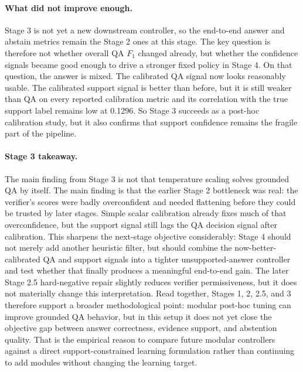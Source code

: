 \paragraph{What did not improve enough.}
Stage 3 is not yet a new downstream controller, so the end-to-end answer and
abstain metrics remain the Stage 2 ones at this stage.
The key question is therefore not whether overall QA \(F_1\) changed already,
but whether the confidence signals became good enough to drive a stronger fixed
policy in Stage 4.
On that question, the answer is mixed.
The calibrated QA signal now looks reasonably usable.
The calibrated support signal is better than before, but it is still weaker
than QA on every reported calibration metric and its correlation with the true
support label remains low at 0.1296.
So Stage 3 succeeds as a post-hoc calibration study, but it also confirms that
support confidence remains the fragile part of the pipeline.

\paragraph{Stage 3 takeaway.}
The main finding from Stage 3 is not that temperature scaling solves grounded
QA by itself.
The main finding is that the earlier Stage 2 bottleneck was real:
the verifier's scores were badly overconfident and needed flattening before
they could be trusted by later stages.
Simple scalar calibration already fixes much of that overconfidence, but the
support signal still lags the QA decision signal after calibration.
This sharpens the next-stage objective considerably:
Stage 4 should not merely add another heuristic filter, but should combine the
now-better-calibrated QA and support signals into a tighter unsupported-answer
controller and test whether that finally produces a meaningful end-to-end gain.
The later Stage 2.5 hard-negative repair slightly reduces verifier
permissiveness, but it does not materially change this interpretation.
Read together, Stages 1, 2, 2.5, and 3 therefore support a broader
methodological point:
modular post-hoc tuning can improve grounded QA behavior, but in this setup it
does not yet close the objective gap between answer correctness, evidence
support, and abstention quality.
That is the empirical reason to compare future modular controllers against a
direct support-constrained learning formulation rather than continuing to add
modules without changing the learning target.

